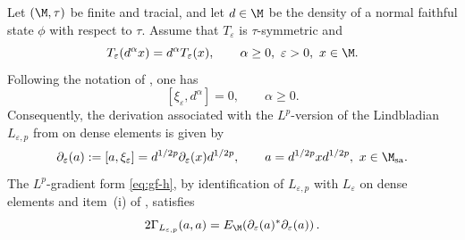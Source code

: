 \documentclass[sn-mathphys-num]{sn-jnl}
\begin{document}
\begin{cor}\label{cor:p-derivation}
Let $(\M,\tau)$ be finite and tracial, and let $d\in \M$ be the density of
a normal faithful state $\phi$ with respect to $\tau$. Assume that $T_\varepsilon$
is $\tau$-symmetric and
\[
  T_\varepsilon(d^\alpha x)=d^\alpha T_\varepsilon(x),
  \qquad \alpha\ge0,\ \varepsilon>0,\ x\in\M .
\]
Following the notation of , one has
\[
  [\xi_\varepsilon,d^\alpha]=0,
  \qquad \alpha\ge0.
\]
Consequently, the derivation associated with the $L^p$-version of the
Lindbladian $L_{\varepsilon,p}$ from  on dense elements is given by
\begin{equation}\label{eq:p-derivation}
      \partial_{\varepsilon}(a)
  :=
  [a,\xi_\varepsilon]
  =
  d^{1/2p}\partial_\varepsilon(x)d^{1/2p},
  \qquad
  a=d^{1/2p}x d^{1/2p},\ x\in \M_{\mathrm{sa}}.
\end{equation}
The $L^p$-gradient form \cref{eq:gf-h}, by identification of
$L_{\varepsilon,p}$ with $L_\varepsilon$ on dense elements and item~(i) of
, satisfies
\[
  2\Gamma_{L_{\varepsilon,p}}(a,a)
  =
  E_{\M}\!\left(
    \partial_{\varepsilon}(a)^*
    \partial_{\varepsilon}(a)
  \right).
\]
\end{cor}
\end{document}
